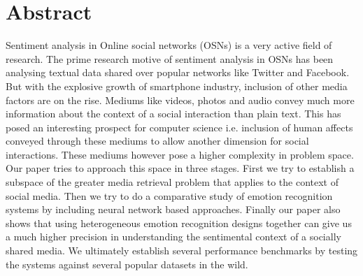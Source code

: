 \section{Abstract}
Sentiment analysis in Online social networks (OSNs) is a very active field of research. The prime research motive of sentiment analysis in OSNs has been analysing textual data shared over popular networks like Twitter and Facebook. But with the explosive growth of smartphone industry, inclusion of other media factors are on the rise. Mediums like videos, photos and audio convey much more information about the context of a social interaction than plain text. This has posed an interesting prospect for computer science i.e. inclusion of human affects conveyed through these mediums to allow another dimension for social interactions. These mediums however pose a higher complexity in problem space. Our paper tries to approach this space in three stages. First we try to establish a subspace of the greater media retrieval problem that applies to the context of social media. Then we try to do a comparative study of emotion recognition systems  by including neural network based approaches. Finally our paper also shows that using heterogeneous emotion recognition designs together can give us a much higher precision in understanding the sentimental context of a socially shared media. We ultimately establish several performance benchmarks by testing the systems against several popular datasets in the wild. 